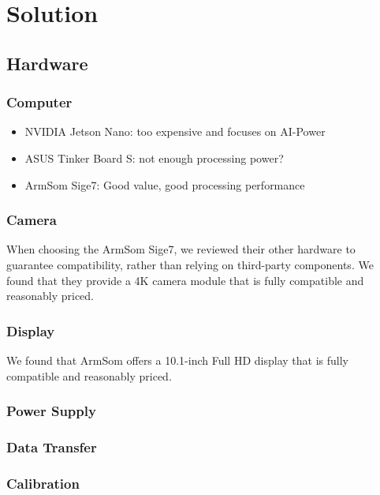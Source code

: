 \chapter{Solution}

\section{Hardware}

\subsection{Computer}

\begin{itemize}
	\item NVIDIA Jetson Nano: too expensive and focuses on AI-Power
	\item ASUS Tinker Board S: not enough processing power?
	\item ArmSom Sige7: Good value, good processing performance
\end{itemize}


\subsection{Camera}

When choosing the ArmSom Sige7, we reviewed their other hardware to guarantee compatibility, rather than relying on third-party components. We found that they provide a 4K camera module that is fully compatible and reasonably priced.

\subsection{Display}

We found that ArmSom offers a 10.1-inch Full HD display that is fully compatible and reasonably priced.

\subsection{Power Supply}

\subsection{Data Transfer}

\subsection{Calibration}

